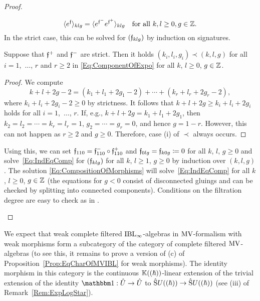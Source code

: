 \documentclass[\MainFolder/Text.tex]{subfiles}
\begin{document}
\begin{proof}
\begin{ProofList}
\begin{equation}\label{Eq:IndEqComp}
 \langle e^{\mathfrak{f}} \rangle_{klg} = \langle e^{\mathfrak{f}^-}e^{\mathfrak{f}^+}\rangle_{klg}\quad\text{for all }k, l\ge 0, g\in\mathbb{Z}.
\end{equation}
In the strict case, this can be solved for $(\mathfrak{f}_{klg})$ by induction on signatures.
\begin{SubClaim}
Suppose that $\mathfrak{f}^+$ and $\mathfrak{f}^-$ are strict. Then it holds $(k_i,l_i,g_i)\prec (k,l,g)$ for all $i=1$,~$\dotsc$, $r$ and $r\ge 2$ in \eqref{Eq:ComponentOfExpo} for all $k$, $l\ge 0$, $g\in\mathbb{Z}$.
\end{SubClaim}
\begin{proof}
We compute
\[ k + l + 2g - 2 = (k_1 + l_1 + 2 g_1 -2) + \dotsb + (k_r + l_r + 2 g_r -2), \]
where $k_i + l_i + 2g_i - 2 \ge 0$ by strictness. It follows that $k+l+2g \ge k_i + l_i + 2 g_i$ holds for all $i=1$,~$\dotsc$, $r$. If, e.g., $k + l + 2g = k_1 + l_1 + 2 g_1$, then $k_2 = l_2 = \dotsb = k_r = l_r = 1$, $g_2 = \dotsb = g_r = 0$, and hence $g = 1-r$. However, this can not happen as $r\ge 2$ and $g\ge 0$. Therefore, case (i) of $\prec$ always occurs.
\renewcommand{\qed}{\hfill\textit{(Subclaim) }$\square$}
\end{proof}
Using this, we can set $\mathfrak{f}_{110} = \mathfrak{f}^-_{110}\circ\mathfrak{f}^+_{110}$ and $\mathfrak{f}_{0lg}=\mathfrak{f}_{k0g}\coloneqq 0$ for all $k$, $l$, $g\ge 0$ and solve~\eqref{Eq:IndEqComp} for $(\mathfrak{f}_{klg})$ for all $k$, $l\ge 1$, $g\ge 0$ by induction over $(k,l,g)$. The solution \eqref{Eq:CompositionOfMorphisms} will solve~\eqref{Eq:IndEqComp} for all $k$, $l\ge 0$, $g\in \mathbb{Z}$ (the equations for $g<0$ consist of disconnected gluings and can be checked by splitting into connected components). Conditions on the filtration degree are easy to check as in \cite[Lemma~8.5]{Cieliebak2015}.
\qedhere
\end{ProofList}
\end{proof}

We expect that weak complete filtered $\mathrm{IBL}_\infty$-algebras in $\mathrm{MV}$-formalism with weak morphisms form a subcategory of the category of complete filtered $\mathrm{MV}$-algebras (to see this, it remains to prove a version of (c) of Proposition~\ref{Prop:EqCharOfMVIBL} for weak morphisms). The identity morphism in this category is the continuous $\mathbb{K}((\hbar))$-linear extension of the trivial extension of the identity $\Id: \hat{U} \rightarrow \hat{U}$ to $\hat{\mathrm{S}}U((\hbar))\rightarrow\hat{\mathrm{S}}U((\hbar))$ (see (iii) of Remark~\ref{Rem:ExpLogStar}).
\end{document}
